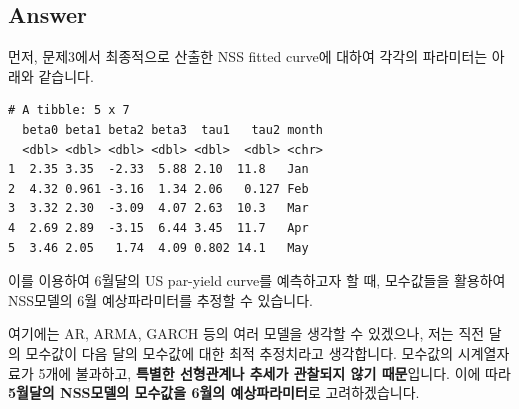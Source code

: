 \documentclass[
  a4paper,
  DIV=11,
  numbers=noendperiod]{scrreprt}
\newenvironment{Shaded}{\begin{snugshade}}{\end{snugshade}}
\newcommand{\AttributeTok}[1]{\textcolor[rgb]{0.40,0.45,0.13}{#1}}
\newcommand{\FunctionTok}[1]{\textcolor[rgb]{0.28,0.35,0.67}{#1}}
\newcommand{\NormalTok}[1]{\textcolor[rgb]{0.00,0.23,0.31}{#1}}
\newcommand{\OtherTok}[1]{\textcolor[rgb]{0.00,0.23,0.31}{#1}}
\newcommand{\SpecialCharTok}[1]{\textcolor[rgb]{0.37,0.37,0.37}{#1}}
\newcommand{\StringTok}[1]{\textcolor[rgb]{0.13,0.47,0.30}{#1}}
\begin{document}
\subsection*{Answer}\label{answer-8}

먼저, 문제3에서 최종적으로 산출한 NSS fitted curve에 대하여 각각의
파라미터는 아래와 같습니다.

\begin{Shaded}
\end{Shaded}

\begin{verbatim}
# A tibble: 5 x 7
  beta0 beta1 beta2 beta3  tau1   tau2 month
  <dbl> <dbl> <dbl> <dbl> <dbl>  <dbl> <chr>
1  2.35 3.35  -2.33  5.88 2.10  11.8   Jan  
2  4.32 0.961 -3.16  1.34 2.06   0.127 Feb  
3  3.32 2.30  -3.09  4.07 2.63  10.3   Mar  
4  2.69 2.89  -3.15  6.44 3.45  11.7   Apr  
5  3.46 2.05   1.74  4.09 0.802 14.1   May  
\end{verbatim}

이를 이용하여 6월달의 US par-yield curve를 예측하고자 할 때, 모수값들을
활용하여 NSS모델의 6월 예상파라미터를 추정할 수 있습니다.

여기에는 AR, ARMA, GARCH 등의 여러 모델을 생각할 수 있겠으나, 저는 직전
달의 모수값이 다음 달의 모수값에 대한 최적 추정치라고 생각합니다.
모수값의 시계열자료가 5개에 불과하고, \textbf{특별한 선형관계나 추세가
관찰되지 않기 때문}입니다. 이에 따라 \textbf{5월달의 NSS모델의 모수값을
6월의 예상파라미터}로 고려하겠습니다.
\end{document}
